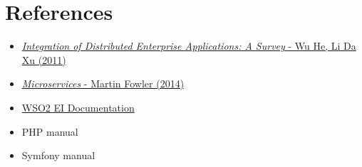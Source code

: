 \documentclass[12pt,a4paper,twoside]{article}
\begin{document}
\section*{References}
\begin{itemize}
	\item \href{https://eclass.upatras.gr/modules/document/file.php/EE653/\%CE\%95\%CF\%81\%CE\%B3\%CE\%B1\%CF\%83\%CE\%AF\%CE\%B5\%CF\%82/Integration\%20of\%20Distributed\%20Enterprise\%20Applications_A\%20Survey.pdf}{\textit{Integration of Distributed Enterprise Applications: A Survey} - Wu He, Li Da Xu (2011)}
	\item \href{https://martinfowler.com/articles/microservices.html}{\textit{Microservices} - Martin Fowler (2014)}
	\item \href{https://docs.wso2.com/display/EI611/WSO2+Enterprise+Integrator+Documentation}{WSO2 EI Documentation}
	\item PHP manual
	\item Symfony manual
\end{itemize}
\newpage
\end{document}
